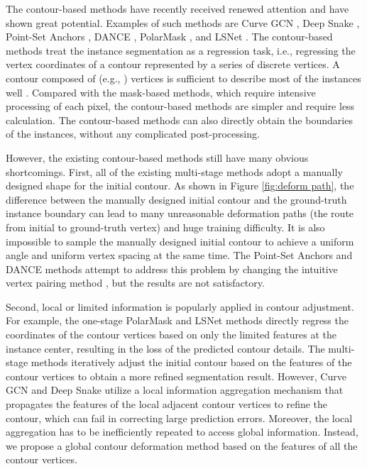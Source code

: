 \documentclass[10pt,twocolumn,letterpaper]{article}
\begin{document}
The contour-based methods have recently received renewed attention and have shown great potential. Examples of such methods are Curve GCN \cite{curvegcn}, Deep Snake \cite{deepsnake}, Point-Set Anchors \cite{pointset}, DANCE \cite{dance}, PolarMask \cite{polarmask}, and LSNet \cite{lsnet}. The contour-based methods treat the instance segmentation as a regression task, i.e., regressing the vertex coordinates of a contour represented by a series of discrete vertices. A contour composed of  (e.g., ) vertices is sufficient to describe most of the instances well \cite{deepsnake}. Compared with the mask-based methods, which require intensive processing of each pixel, the contour-based methods are simpler and require less calculation. The contour-based methods can also directly obtain the boundaries of the instances, without any complicated post-processing.
 
However, the existing contour-based methods still have many obvious shortcomings. First, all of the existing multi-stage methods adopt a manually designed shape for the initial contour. As shown in Figure \ref{fig:deform path}, the difference between the manually designed initial contour and the ground-truth instance boundary can lead to many unreasonable deformation paths (the route from initial to ground-truth vertex) and huge training difficulty. It is also impossible to sample the manually designed initial contour to achieve a uniform angle and uniform vertex spacing at the same time. The Point-Set Anchors and DANCE methods attempt to address this problem by changing the intuitive vertex pairing method \cite{pointset, dance}, but the results are not satisfactory.

Second, local or limited information is popularly applied in contour adjustment. For example, the one-stage PolarMask \cite{polarmask} and LSNet \cite{lsnet} methods directly regress the coordinates of the contour vertices based on only the limited features at the instance center, resulting in the loss of the predicted contour details. The multi-stage methods iteratively adjust the initial contour based on the features of the contour vertices to obtain a more refined segmentation result. However, Curve GCN and Deep Snake utilize a local information aggregation mechanism that propagates the features of the local adjacent contour vertices to refine the contour, which can fail in correcting large prediction errors. Moreover, the local aggregation has to be inefficiently repeated to access global information. Instead, we propose a global contour deformation method based on the features of all the contour vertices.
\end{document}
